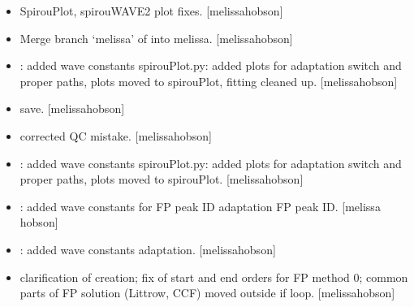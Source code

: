 \documentclass[a4paper,10pt,english]{report}
\begin{document}
\begin{itemize}
\item {} 
SpirouPlot, spirouWAVE2 \sphinxhyphen{} plot fixes. {[}melissa\sphinxhyphen{}hobson{]}

\item {} 
Merge branch ‘melissa’ of  into
melissa. {[}melissa\sphinxhyphen{}hobson{]}

\item {} 
: added wave constants spirouPlot.py: added plots
for   \sphinxhyphen{}  adaptation \sphinxhyphen{}
 switch and proper paths, plots moved to spirouPlot,
fitting cleaned up. {[}melissa\sphinxhyphen{}hobson{]}

\item {} 
 save. {[}melissa\sphinxhyphen{}hobson{]}

\item {} 
 \sphinxhyphen{} corrected QC mistake. {[}melissa\sphinxhyphen{}hobson{]}

\item {} 
: added wave constants spirouPlot.py: added plots
for   \sphinxhyphen{}  adaptation \sphinxhyphen{}
 switch and proper paths, plots moved to spirouPlot.
{[}melissa\sphinxhyphen{}hobson{]}

\item {} 
: added wave constants for FP peak ID
 \sphinxhyphen{}  adaptation \sphinxhyphen{} FP peak ID. {[}melissa\sphinxhyphen{}
hobson{]}

\item {} 
: added wave constants  \sphinxhyphen{}
 adaptation. {[}melissa\sphinxhyphen{}hobson{]}

\item {} 
 \sphinxhyphen{} clarification of  creation; fix of start and
end orders for FP method 0; common parts of FP solution (Littrow, CCF)
moved outside if loop. {[}melissa\sphinxhyphen{}hobson{]}


\end{itemize}
\end{document}
